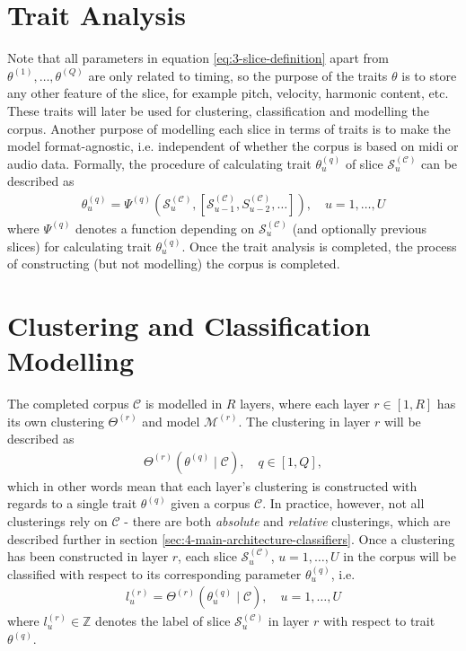\section{Trait Analysis}\label{sec:3-corpus-traits}
Note that all parameters in equation \ref{eq:3-slice-definition} apart from $\theta^{(1)}, \dots, \theta^{(Q)}$ are only related to timing, so the purpose of the traits $\theta$ is to store any other feature of the slice, for example pitch, velocity, harmonic content, etc. These traits will later be used for clustering, classification and modelling the corpus. Another purpose of modelling each slice in terms of traits is to make the model format-agnostic, i.e. independent of whether the corpus is based on midi or audio data. Formally, the procedure of calculating trait $\theta^{(q)}_u$ of slice $\mathcal S_u^{(\mathcal C)}$ can be described as 
\begin{align}\label{eq:3-trait-analysis}
	\theta^{(q)}_u = \Psi^{(q)} \left(\mathcal S_u^{(\mathcal C)}, \left[ \mathcal S^{(\mathcal C)}_{u-1},S^{(\mathcal C)}_{u-2},\dots\right]\right), \quad u = 1,\dots, U
\end{align}
where $\Psi^{(q)}$ denotes a function depending on $\mathcal S^{(\mathcal C)}_u$ (and optionally previous slices) for calculating trait $\theta^{(q)}_u$. Once the trait analysis is completed, the process of constructing (but not modelling) the corpus is completed. 

\section{Clustering and Classification Modelling}\label{sec:3-corpus-clustering}
The completed corpus $\mathcal C$  is modelled in $R$ layers, where each layer $r \in [1,R]$ has its own clustering $\Theta^{(r)}$ and model $\mathcal M^{(r)}$. The clustering in layer $r$ will be described as
\begin{align}\label{eq:3-corpus-clustering}
	\Theta^{(r)}\left(\theta^{(q)} \mid \mathcal C\right), \quad q \in [1, Q],
\end{align}
which in other words mean that each layer's clustering is constructed with regards to a single trait $\theta^{(q)}$ given a corpus $\mathcal C$. In practice, however, not all clusterings rely on $\mathcal C$ - there are both \textit{absolute} and \textit{relative} clusterings, which are described further in section \ref{sec:4-main-architecture-classifiers}. Once a clustering has been constructed in layer $r$, each slice $\mathcal S^{(\mathcal C)}_u$, $u= 1,\dots,U$ in the corpus will be classified with respect to its corresponding parameter $\theta^{(q)}_u$, i.e.
\begin{align}\label{eq:3-classification}
	l_u^{(r)} = \Theta^{(r)}	\left(\theta^{(q)}_u \mid \mathcal C\right), \quad u=1,\dots, U
\end{align}
where $l_u^{(r)} \in \mathbb Z$ denotes the label of slice $\mathcal S^{(\mathcal C)}_u$ in layer $r$ with respect to trait $\theta^{(q)}$.

